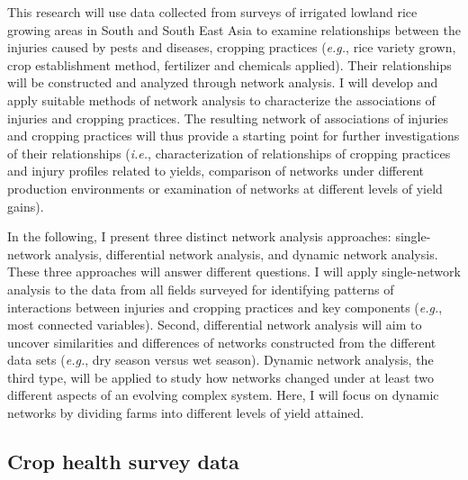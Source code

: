 
This research will use data collected from surveys of irrigated lowland rice growing areas in South and South East Asia to examine relationships between the injuries caused by pests and diseases, cropping practices (\textit{e.g.}, rice variety grown, crop establishment method, fertilizer and chemicals applied). Their relationships will be constructed and analyzed through network analysis. I will develop and apply suitable methods of network analysis to characterize the associations of injuries and cropping practices. The resulting network of associations of injuries and cropping practices will thus provide a starting point for further investigations of their relationships (\textit{i.e.}, characterization of relationships of cropping practices and injury profiles related to yields, comparison of networks under different production environments or examination of networks at different levels of yield gains). 

In the following, I present three distinct network analysis approaches: single-network analysis, differential network analysis, and dynamic network analysis. These three approaches will answer different questions. I will apply single-network analysis to the data from all fields surveyed for identifying patterns of interactions between injuries and cropping practices and key components (\textit{e.g.}, most connected variables). Second, differential network analysis will aim to uncover similarities and differences of networks constructed from the different data sets (\textit{e.g.}, dry season versus wet season). Dynamic network analysis, the third type, will be applied to study how networks changed under at least two different aspects of an evolving complex system. Here, I will focus on dynamic networks by dividing farms into different levels of yield attained. 

\subsection*{Crop health survey data}

